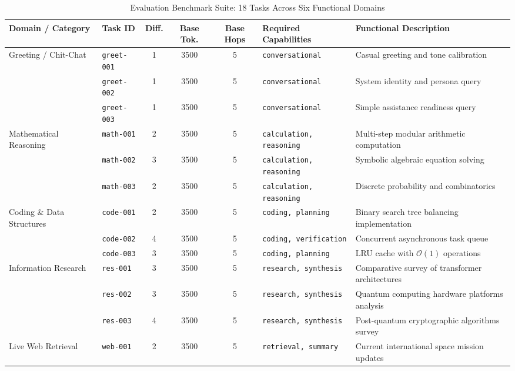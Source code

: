 \begin{table}[!t]
\centering
\caption{Evaluation Benchmark Suite: 18 Tasks Across Six Functional Domains}
\label{tab:benchmark_suite}
\footnotesize
\begin{tabular}{llccclp{4.5cm}}
\toprule
\textbf{Domain / Category} & \textbf{Task ID} & \textbf{Diff.} & \textbf{Base Tok.} & \textbf{Base Hops} & \textbf{Required Capabilities} & \textbf{Functional Description} \\
\midrule
\multirow{3}{*}{Greeting / Chit-Chat} 
& \texttt{greet-001} & 1 & 3500 & 5 & \texttt{conversational} & Casual greeting and tone calibration \\
& \texttt{greet-002} & 1 & 3500 & 5 & \texttt{conversational} & System identity and persona query \\
& \texttt{greet-003} & 1 & 3500 & 5 & \texttt{conversational} & Simple assistance readiness query \\
\midrule
\multirow{3}{*}{Mathematical Reasoning} 
& \texttt{math-001} & 2 & 3500 & 5 & \texttt{calculation, reasoning} & Multi-step modular arithmetic computation \\
& \texttt{math-002} & 3 & 3500 & 5 & \texttt{calculation, reasoning} & Symbolic algebraic equation solving \\
& \texttt{math-003} & 2 & 3500 & 5 & \texttt{calculation, reasoning} & Discrete probability and combinatorics \\
\midrule
\multirow{3}{*}{Coding \& Data Structures} 
& \texttt{code-001} & 2 & 3500 & 5 & \texttt{coding, planning} & Binary search tree balancing implementation \\
& \texttt{code-002} & 4 & 3500 & 5 & \texttt{coding, verification} & Concurrent asynchronous task queue \\
& \texttt{code-003} & 3 & 3500 & 5 & \texttt{coding, planning} & LRU cache with $\mathcal{O}(1)$ operations \\
\midrule
\multirow{3}{*}{Information Research} 
& \texttt{res-001} & 3 & 3500 & 5 & \texttt{research, synthesis} & Comparative survey of transformer architectures \\
& \texttt{res-002} & 3 & 3500 & 5 & \texttt{research, synthesis} & Quantum computing hardware platforms analysis \\
& \texttt{res-003} & 4 & 3500 & 5 & \texttt{research, synthesis} & Post-quantum cryptographic algorithms survey \\
\midrule
\multirow{3}{*}{Live Web Retrieval} 
& \texttt{web-001} & 2 & 3500 & 5 & \texttt{retrieval, summary} & Current international space mission updates \\

\end{tabular}
\end{table}
